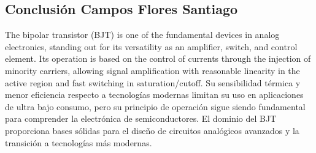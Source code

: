 \subsection{Conclusión Campos Flores Santiago}

The bipolar transistor (BJT) is one of the fundamental devices in analog electronics, standing out for its versatility as an amplifier, switch, and control element. Its operation is based on the control of currents through the injection of minority carriers, allowing signal amplification with reasonable linearity in the active region and fast switching in saturation/cutoff.
Su sensibilidad térmica y menor eficiencia respecto a tecnologías modernas limitan su uso en aplicaciones de ultra bajo consumo, pero su principio de operación sigue siendo fundamental para comprender la electrónica de semiconductores. El dominio del BJT proporciona bases sólidas para el diseño de circuitos analógicos avanzados y la transición a tecnologías más modernas.